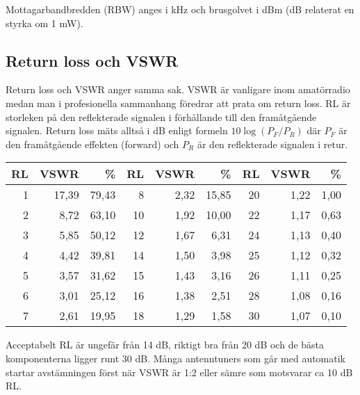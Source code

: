 Mottagarbandbredden (RBW) anges i kHz och brusgolvet i dBm (dB relaterat en styrka om 1 mW).

\subsection{Return loss och VSWR}

Return loss och VSWR anger samma sak. VSWR är vanligare inom amatörradio medan man i profesionella sammanhang föredrar att prata om return loss. RL är storleken på den reflekterade signalen i förhållande till den framåtgående signalen. Return loss mäts alltså i dB enligt formeln $10\log(P_F/P_R)$ där $P_F$ är den framåtgående effekten (forward) och  $P_R$ är den reflekterade signalen i retur.

\begin{longtable}{rrr|rrr|rrr}
	\textbf{RL} & \textbf{VSWR} & \textbf{\%} & \textbf{RL} & \textbf{VSWR} & \textbf{\%} & \textbf{RL} & \textbf{VSWR} & \textbf{\%} \\ \hline 	\endhead
	          1 &         17,39 &       79,43 &           8 &          2,32 &       15,85 &          20 &          1,22 &        1,00 \\
	          2 &          8,72 &       63,10 &          10 &          1,92 &       10,00 &          22 &          1,17 &        0,63 \\
	          3 &          5,85 &       50,12 &          12 &          1,67 &        6,31 &          24 &          1,13 &        0,40 \\
	          4 &          4,42 &       39,81 &          14 &          1,50 &        3,98 &          25 &          1,12 &        0,32 \\
	          5 &          3,57 &       31,62 &          15 &          1,43 &        3,16 &          26 &          1,11 &        0,25 \\
	          6 &          3,01 &       25,12 &          16 &          1,38 &        2,51 &          28 &          1,08 &        0,16 \\
	          7 &          2,61 &       19,95 &          18 &          1,29 &        1,58 &          30 &          1,07 &        0,10
\end{longtable}

Acceptabelt RL är ungefär från 14 dB, riktigt bra från 20 dB och de bästa komponenterna ligger runt 30 dB. Många antenntuners som går med automatik startar avstämningen först när VSWR är 1:2 eller sämre som motsvarar ca 10 dB RL.


